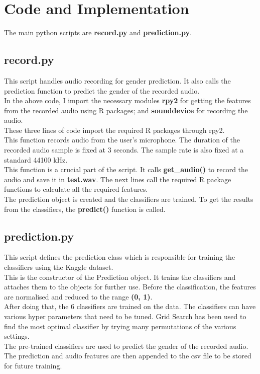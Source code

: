 \documentclass[12pt]{article}
\begin{document}
	\section{Code and Implementation}
		The main python scripts are \textbf{record.py} and \textbf{prediction.py}.
		\subsection{record.py}
			This script handles audio recording for gender prediction. It also calls the prediction function to predict the gender of the recorded audio.\\
			
			In the above code, I import the necessary modules \textbf{rpy2} for getting the features from the recorded audio using R packages; and \textbf{sounddevice} for recording the audio.\\
			
			These three lines of code import the required R packages through rpy2.\\
			
			This function records audio from the user's microphone. The duration of the recorded audio sample is fixed at 3 seconds. The sample rate is also fixed at a standard 44100 kHz.\\
			
			This function is a crucial part of the script. It calls \textbf{get\_audio()} to record the audio and save it in \textbf{test.wav}. The next lines call the required R package functions to calculate all the required features.\\
			
			The prediction object is created and the classifiers are trained. To get the results from the classifiers, the \textbf{predict()} function is called.
		\subsection{prediction.py}
			This script defines the prediction class which is responsible for training the classifiers using the Kaggle dataset.\\
			
			This is the constructor of the Prediction object. It trains the classifiers and attaches them to the objects for further use. Before the classification, the features are normalised and reduced to the range \textbf{(0, 1)}.\\
			After doing that, the 6 classifiers are trained on the data. The classifiers can have various hyper parameters that need to be tuned. Grid Search has been used to find the most optimal classifier by trying many permutations of the various settings.\\
			
			The pre-trained classifiers are used to predict the gender of the recorded audio. The prediction and audio features are then appended to the csv file to be stored for future training.
\end{document}
